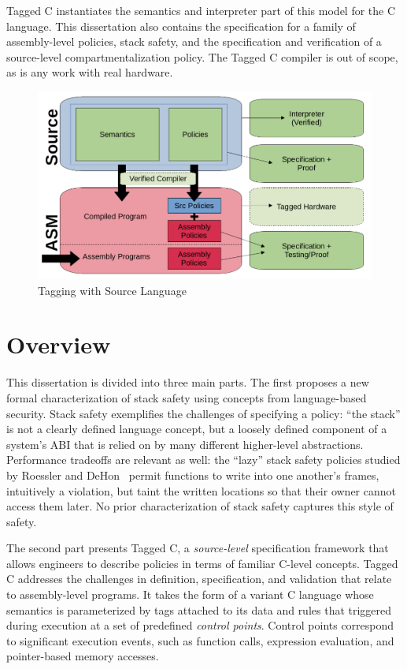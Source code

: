 \documentclass{report}
\begin{document}
Tagged C instantiates the semantics and interpreter part of this model for the C language.
This dissertation also contains the specification for a family of assembly-level policies,
stack safety, and the specification and verification of a source-level compartmentalization
policy. The Tagged C compiler is out of scope, as is any work with real hardware.

\begin{figure}
  \includegraphics[width=\textwidth]{Structure.png}
  \caption{Tagging with Source Language}
  \label{fig:language}
\end{figure}

\section{Overview}

This dissertation is divided into three main parts. The first proposes a new formal characterization
of stack safety using concepts from language-based security. Stack safety exemplifies the challenges
of specifying a policy: ``the stack'' is not a clearly defined language concept, but a loosely
defined component of a system's ABI that is relied on by many different higher-level abstractions.
Performance tradeoffs are relevant as well: the ``lazy'' stack safety policies studied by
Roessler and DeHon~\cite{RoesslerD18} permit functions to write into one another's
frames, intuitively a violation, but taint the written locations so that their owner cannot
access them later. No prior characterization of stack safety captures this style of safety.

The second part presents Tagged C, a \emph{source-level} specification framework that allows
engineers to describe policies in terms of familiar C-level concepts. Tagged C addresses the
challenges in definition, specification, and validation that relate to assembly-level programs.
It takes the form of a variant C language whose semantics is parameterized by tags
attached to its data and rules that triggered during execution at a set of predefined
\emph{control points}. Control points correspond to significant execution events, such as
function calls, expression evaluation, and pointer-based memory accesses.
\end{document}
